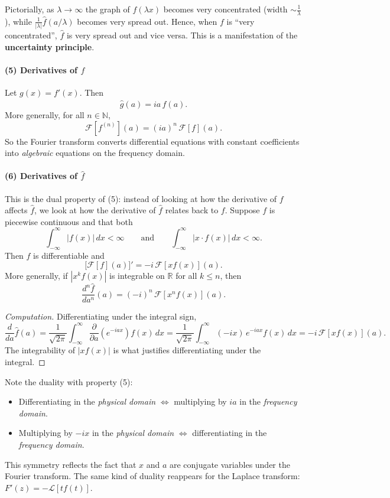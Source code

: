 \begin{remark}
Pictorially, as $\lambda \to \infty$ the graph of $f(\lambda x)$ becomes very concentrated (width $\sim \frac{1}{\lambda}$), while $\frac{1}{|\lambda|}\hat{f}(a/\lambda)$ becomes very spread out. Hence, when $f$ is ``very concentrated'', $\hat{f}$ is very spread out and vice versa. This is a manifestation of the \textbf{uncertainty principle}.
\end{remark}

\paragraph{(5) Derivatives of $f$}
Let $g(x) = f'(x)$. Then
\[
\hat{g}(a) = ia\,\hat{f}(a).
\]
More generally, for all $n \in \mathbb{N}$,
\[
\mathcal{F}[f^{(n)}](a) = (ia)^n\,\mathcal{F}[f](a).
\]
So the Fourier transform converts differential equations with constant coefficients into \textit{algebraic} equations on the frequency domain.

\paragraph{(6) Derivatives of $\hat{f}$}
This is the dual property of (5): instead of looking at how the derivative of $f$ affects $\hat{f}$, we look at how the derivative of $\hat{f}$ relates back to $f$. Suppose $f$ is piecewise continuous and that both
\[
\int_{-\infty}^{\infty} |f(x)|\,dx < \infty
\qquad \text{and} \qquad
\int_{-\infty}^{\infty} |x \cdot f(x)|\,dx < \infty.
\]
Then $\hat{f}$ is differentiable and
\[
\boxed{\big[\mathcal{F}[f](a)\big]' = -i\,\mathcal{F}[x f(x)](a).}
\]
More generally, if $|x^k f(x)|$ is integrable on $\mathbb{R}$ for all $k \leq n$, then
\[
\frac{d^n \hat{f}}{da^n}(a) = (-i)^n\,\mathcal{F}[x^n f(x)](a).
\]
\begin{proof}[Computation]
Differentiating under the integral sign,
\[
\frac{d}{da}\hat{f}(a)
= \frac{1}{\sqrt{2\pi}}\int_{-\infty}^{\infty} \frac{\partial}{\partial a}\!\left(e^{-iax}\right) f(x)\, dx
= \frac{1}{\sqrt{2\pi}}\int_{-\infty}^{\infty} (-ix)\,e^{-iax} f(x)\, dx
= -i\,\mathcal{F}[x f(x)](a).
\]
The integrability of $|x f(x)|$ is what justifies differentiating under the integral.
\end{proof}

\begin{remark}
Note the duality with property (5):
\begin{itemize}
  \item Differentiating in the \emph{physical domain} $\Longleftrightarrow$ multiplying by $ia$ in the \emph{frequency domain}.
  \item Multiplying by $-ix$ in the \emph{physical domain} $\Longleftrightarrow$ differentiating in the \emph{frequency domain}.
\end{itemize}
This symmetry reflects the fact that $x$ and $a$ are conjugate variables under the Fourier transform. The same kind of duality reappears for the Laplace transform: $F'(z) = -\mathcal{L}[t f(t)]$.
\end{remark}

